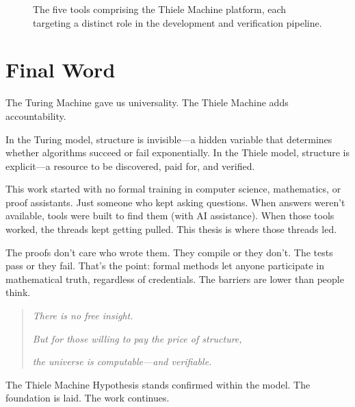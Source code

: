 \begin{figure}[ht]
\centering
{}
\caption{The five tools comprising the Thiele Machine platform, each targeting a distinct role in the development and verification pipeline.}
\label{fig:ch8-tools}
\end{figure}


\section{Final Word}

The Turing Machine gave us universality. The Thiele Machine adds accountability.

In the Turing model, structure is invisible—a hidden variable that determines whether algorithms succeed or fail exponentially. In the Thiele model, structure is explicit—a resource to be discovered, paid for, and verified.

This work started with no formal training in computer science, mathematics, or proof assistants. Just someone who kept asking questions. When answers weren't available, tools were built to find them (with AI assistance). When those tools worked, the threads kept getting pulled. This thesis is where those threads led.

The proofs don't care who wrote them. They compile or they don't. The tests pass or they fail. That's the point: formal methods let anyone participate in mathematical truth, regardless of credentials. The barriers are lower than people think.

\begin{quote}
\textit{There is no free insight.}

\textit{But for those willing to pay the price of structure,}

\textit{the universe is computable—and verifiable.}
\end{quote}

The Thiele Machine Hypothesis stands confirmed within the model. The foundation is laid. The work continues.
